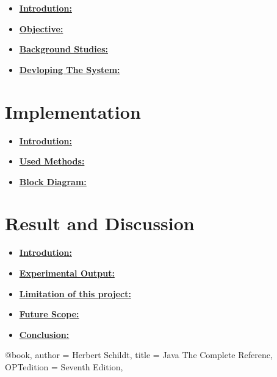 \documentclass[12pt,a4paper]{report}
\begin{document}
\begin{itemize}
	\item \textbf{\underline{Introdution:}}\\
	\vspace{1cm}
	\item \textbf{\underline{Objective:}}\\
	\vspace{1cm}
	\item \textbf{\underline{Background Studies:}}\\
	\vspace{1cm}
	\item \textbf{\underline{Devloping The System:}}\\
\end{itemize}
{\color{blue}\chapter{Implementation}}
\begin{itemize}
	\item \textbf{\underline{Introdution:}}\\
	\vspace{1cm}
	\item \textbf{\underline{Used Methods:}}\\
	\vspace{1cm}
	\item \textbf{\underline{Block Diagram:}}\\
\end{itemize}
{\color{blue}\chapter{Result and Discussion}}
\begin{itemize}
	\item \textbf{\underline{Introdution:}}\\
	\vspace{1cm}
	\item \textbf{\underline{Experimental Output:}}\\
	\vspace{1cm}
	\item \textbf{\underline{Limitation of this project:}}\\
	\vspace{1cm}
	\item \textbf{\underline{Future Scope:}}\\
	\vspace{1cm}
	\item \textbf{\underline{Conclusion:}}\\
\end{itemize}
\begin{thebibliography}{widestlabel}
	@book{,
		author = {Herbert Schildt},
		title = {Java The Complete Referenc},
		OPTedition = {Seventh Edition},
	}
	
\end{thebibliography}
\end{document}

